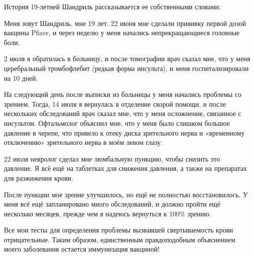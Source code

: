 История 19-летней Шандриль рассказывается ее собственными словами:

Меня зовут Шандриль, мне 19 лет. 22 июня мне сделали прививку первой дозой
вакцины Pfizer, и через неделю у меня начались непрекращающиеся головные боли.

2 июля я обратилась в больницу, и после томографии врач сказал мне, что у меня
церебральный тромбофлебит (редкая форма инсульта), и меня госпитализировали на
10 дней.

На следующий день после выписки из больницы у меня начались проблемы со
зрением. Тогда, 14 июля я вернулась в отделение скорой помощи, и после
нескольких обследований врач сказал мне, что у меня осложнение, связанное с
инсультом. Офтальмолог объяснил мне, что у меня было слишком большое давление в
черепе, что привело к отеку диска зрительного нерва и «временному отключению»
зрительного нерва в моём левом глазу.

22 июля невролог сделал мне люмбальную пункцию, чтобы снизить это давление. Я
всё ещё на таблетках для снижения давления, а также на препаратах для разжижения
крови.

После пункции мое зрение улучшилось, но ещё не полностью восстановилось. У меня
всё ещё запланировано много обследований, и должно пройти ещё несколько месяцев,
прежде чем я надеюсь вернуться к 100\% зрению.

Все мои тесты для определения проблемы вызвавшей свертываемость крови
отрицательные. Таким образом, единственным правдоподобным объяснением моего
заболевания остается иммунизация вакциной!
